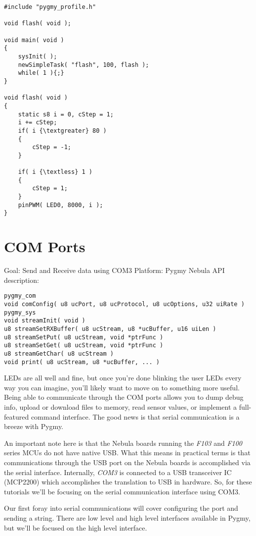 \documentclass{article}
\begin{document}
\begin{lstlisting}
#include "pygmy_profile.h"

void flash( void );

void main( void )
{
	sysInit( );
	newSimpleTask( "flash", 100, flash );
	while( 1 ){;}
}

void flash( void )
{
	static s8 i = 0, cStep = 1;
	i += cStep;
	if( i {\textgreater} 80 )
	{
		cStep = -1;
	}

	if( i {\textless} 1 )
	{
		cStep = 1;
	}
	pinPWM( LED0, 8000, i );
}
\end{lstlisting}

\section{COM Ports}
Goal: Send and Receive data using COM3
Platform: Pygmy Nebula
API description:
\begin{verbatim}
pygmy_com
void comConfig( u8 ucPort, u8 ucProtocol, u8 ucOptions, u32 uiRate )
pygmy_sys
void streamInit( void )
u8 streamSetRXBuffer( u8 ucStream, u8 *ucBuffer, u16 uiLen )
u8 streamSetPut( u8 ucStream, void *ptrFunc )
u8 streamSetGet( u8 ucStream, void *ptrFunc )
u8 streamGetChar( u8 ucStream )
void print( u8 ucStream, u8 *ucBuffer, ... )
\end{verbatim}

LEDs are all well and fine, but once you're done blinking the user LEDs every way you can imagine, you'll likely want to move on to something more useful. Being able to communicate through the COM ports allows you to dump debug info, upload or download files to memory, read sensor values, or implement a full-featured command interface. The good news is that serial communication is a breeze with Pygmy.

An important note here is that the Nebula boards running the \emph{F103} and \emph{F100} series MCUs do not have native USB. What this means in practical terms is that communications through the USB port on the Nebula boards is accomplished via the serial interface. Internally, \emph{COM3} is connected to a USB transceiver IC (MCP2200) which accomplishes the translation to USB in hardware. So, for these tutorials we'll be focusing on the serial communication interface using COM3.

Our first foray into serial communications will cover configuring the port and sending a string. There are low level and high level interfaces available in Pygmy, but we'll be focused on the high level interface.
\end{document}
